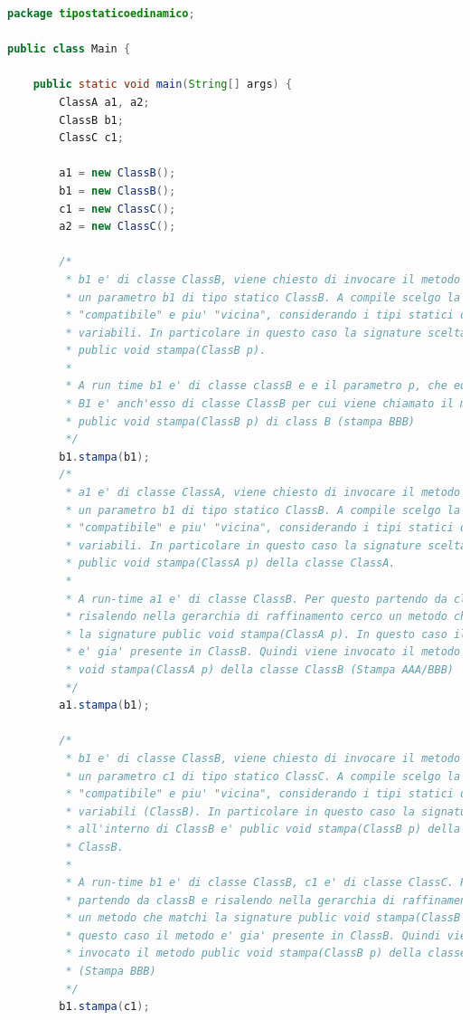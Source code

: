 \documentclass{article}
\begin{document}
\begin{lstlisting}[language=Java,escapechar=|]
package tipostaticoedinamico;

public class Main {

	public static void main(String[] args) {
		ClassA a1, a2;
		ClassB b1;
		ClassC c1;

		a1 = new ClassB();
		b1 = new ClassB();
		c1 = new ClassC();
		a2 = new ClassC();

		/*
		 * b1 e' di classe ClassB, viene chiesto di invocare il metodo stampa su
		 * un parametro b1 di tipo statico ClassB. A compile scelgo la signature
		 * "compatibile" e piu' "vicina", considerando i tipi statici delle
		 * variabili. In particolare in questo caso la signature scelta e'
		 * public void stampa(ClassB p).
		 * 
		 * A run time b1 e' di classe classB e e il parametro p, che equivale a
		 * B1 e' anch'esso di classe ClassB per cui viene chiamato il metodo
		 * public void stampa(ClassB p) di class B (stampa BBB)
		 */
		b1.stampa(b1);
		/*
		 * a1 e' di classe ClassA, viene chiesto di invocare il metodo stampa su
		 * un parametro b1 di tipo statico ClassB. A compile scelgo la signature
		 * "compatibile" e piu' "vicina", considerando i tipi statici delle
		 * variabili. In particolare in questo caso la signature scelta e'
		 * public void stampa(ClassA p) della classe ClassA.
		 * 
		 * A run-time a1 e' di classe ClassB. Per questo partendo da classB e
		 * risalendo nella gerarchia di raffinamento cerco un metodo che matchi
		 * la signature public void stampa(ClassA p). In questo caso il metodo
		 * e' gia' presente in ClassB. Quindi viene invocato il metodo public
		 * void stampa(ClassA p) della classe ClassB (Stampa AAA/BBB)
		 */
		a1.stampa(b1);

		/*
		 * b1 e' di classe ClassB, viene chiesto di invocare il metodo stampa su
		 * un parametro c1 di tipo statico ClassC. A compile scelgo la signature
		 * "compatibile" e piu' "vicina", considerando i tipi statici delle
		 * variabili (ClassB). In particolare in questo caso la signature scelta
		 * all'interno di ClassB e' public void stampa(ClassB p) della classe
		 * ClassB.
		 * 
		 * A run-time b1 e' di classe ClassB, c1 e' di classe ClassC. Per questo
		 * partendo da classB e risalendo nella gerarchia di raffinamento cerco
		 * un metodo che matchi la signature public void stampa(ClassB p). In
		 * questo caso il metodo e' gia' presente in ClassB. Quindi viene
		 * invocato il metodo public void stampa(ClassB p) della classe ClassB
		 * (Stampa BBB)
		 */
		b1.stampa(c1);


\end{lstlisting}
\end{document}
